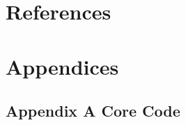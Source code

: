 \documentclass[fontset=windows, 12pt, a4paper]{ctexart}
\begin{document}








\section*{References}


\section*{Appendices}
\subsection*{Appendix A \quad Core Code}

\end{document}
